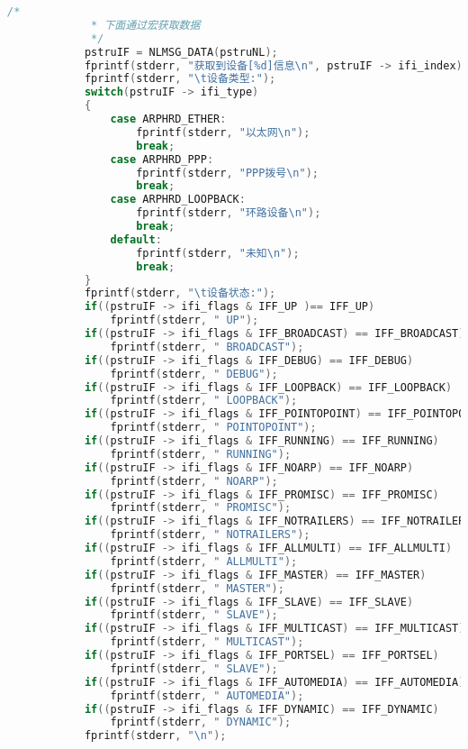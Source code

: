 \documentclass[a4paper,11pt,]{article}%
\begin{document}
\begin{appendices}
\begin{lstlisting}[language=C, caption= NetLink 获取网卡信息]
            /*
             * 下面通过宏获取数据
             */
            pstruIF = NLMSG_DATA(pstruNL);
            fprintf(stderr, "获取到设备[%d]信息\n", pstruIF -> ifi_index);
            fprintf(stderr, "\t设备类型:");
            switch(pstruIF -> ifi_type)
            {
                case ARPHRD_ETHER:
                    fprintf(stderr, "以太网\n");
                    break;
                case ARPHRD_PPP:
                    fprintf(stderr, "PPP拨号\n");
                    break;
                case ARPHRD_LOOPBACK:
                    fprintf(stderr, "环路设备\n");
                    break;
                default:
                    fprintf(stderr, "未知\n");
                    break;
            }
            fprintf(stderr, "\t设备状态:");
            if((pstruIF -> ifi_flags & IFF_UP )== IFF_UP)
                fprintf(stderr, " UP");
            if((pstruIF -> ifi_flags & IFF_BROADCAST) == IFF_BROADCAST)
                fprintf(stderr, " BROADCAST");
            if((pstruIF -> ifi_flags & IFF_DEBUG) == IFF_DEBUG)
                fprintf(stderr, " DEBUG");
            if((pstruIF -> ifi_flags & IFF_LOOPBACK) == IFF_LOOPBACK)
                fprintf(stderr, " LOOPBACK");
            if((pstruIF -> ifi_flags & IFF_POINTOPOINT) == IFF_POINTOPOINT)
                fprintf(stderr, " POINTOPOINT");
            if((pstruIF -> ifi_flags & IFF_RUNNING) == IFF_RUNNING)
                fprintf(stderr, " RUNNING");
            if((pstruIF -> ifi_flags & IFF_NOARP) == IFF_NOARP)
                fprintf(stderr, " NOARP");
            if((pstruIF -> ifi_flags & IFF_PROMISC) == IFF_PROMISC)
                fprintf(stderr, " PROMISC");
            if((pstruIF -> ifi_flags & IFF_NOTRAILERS) == IFF_NOTRAILERS)
                fprintf(stderr, " NOTRAILERS");
            if((pstruIF -> ifi_flags & IFF_ALLMULTI) == IFF_ALLMULTI)
                fprintf(stderr, " ALLMULTI");
            if((pstruIF -> ifi_flags & IFF_MASTER) == IFF_MASTER)
                fprintf(stderr, " MASTER");
            if((pstruIF -> ifi_flags & IFF_SLAVE) == IFF_SLAVE)
                fprintf(stderr, " SLAVE");
            if((pstruIF -> ifi_flags & IFF_MULTICAST) == IFF_MULTICAST)
                fprintf(stderr, " MULTICAST");
            if((pstruIF -> ifi_flags & IFF_PORTSEL) == IFF_PORTSEL)
                fprintf(stderr, " SLAVE");
            if((pstruIF -> ifi_flags & IFF_AUTOMEDIA) == IFF_AUTOMEDIA)
                fprintf(stderr, " AUTOMEDIA");
            if((pstruIF -> ifi_flags & IFF_DYNAMIC) == IFF_DYNAMIC)
                fprintf(stderr, " DYNAMIC");
            fprintf(stderr, "\n");


\end{lstlisting}
\end{appendices}
\end{document}
